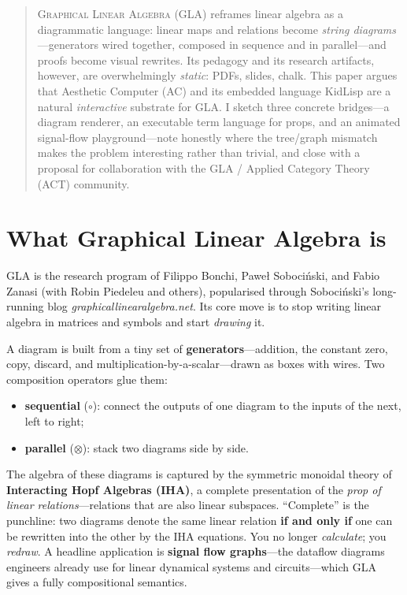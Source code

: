 \documentclass[11pt, letterpaper]{article}
\newcommand{\gla}{\textsc{Graphical Linear Algebra}}
\begin{document}
\begin{multicols}{2}

\begin{abstract}
\noindent
\gla{} (GLA) reframes linear algebra as a diagrammatic language: linear
maps and relations become \emph{string diagrams}---generators wired
together, composed in sequence and in parallel---and proofs become visual
rewrites. Its pedagogy and its research artifacts, however, are
overwhelmingly \emph{static}: PDFs, slides, chalk. This paper argues that
Aesthetic Computer (AC) and its embedded language KidLisp are a natural
\emph{interactive} substrate for GLA. I sketch three concrete
bridges---a diagram renderer, an executable term language for props, and
an animated signal-flow playground---note honestly where the tree/graph
mismatch makes the problem interesting rather than trivial, and close with
a proposal for collaboration with the GLA / Applied Category Theory (ACT)
community.
\end{abstract}

\section{What Graphical Linear Algebra is}

GLA is the research program of Filippo Bonchi, Pawe\l{} Soboci\'nski, and
Fabio Zanasi (with Robin Piedeleu and others), popularised through
Soboci\'nski's long-running blog \emph{graphicallinearalgebra.net}. Its
core move is to stop writing linear algebra in matrices and symbols and
start \emph{drawing} it.

A diagram is built from a tiny set of \textbf{generators}---addition, the
constant zero, copy, discard, and multiplication-by-a-scalar---drawn as
boxes with wires. Two composition operators glue them:

\begin{itemize}
  \item \textbf{sequential} ($\circ$): connect the outputs of one diagram
    to the inputs of the next, left to right;
  \item \textbf{parallel} ($\otimes$): stack two diagrams side by side.
\end{itemize}

The algebra of these diagrams is captured by the symmetric monoidal
theory of \textbf{Interacting Hopf Algebras (IHA)}, a complete
presentation of the \emph{prop of linear relations}---relations that are
also linear subspaces. ``Complete'' is the punchline: two diagrams denote
the same linear relation \textbf{if and only if} one can be rewritten into
the other by the IHA equations. You no longer \emph{calculate}; you
\emph{redraw}. A headline application is \textbf{signal flow
graphs}---the dataflow diagrams engineers already use for linear
dynamical systems and circuits---which GLA gives a fully compositional
semantics.


\end{multicols}
\end{document}

